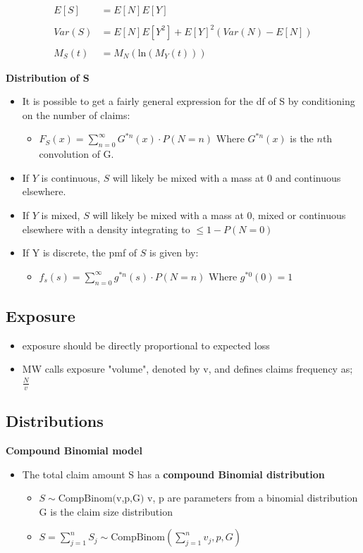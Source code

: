 \documentclass{article}
\begin{document}
\begin{align*}
    E[S] &= E[N]E[Y]\\
    \\
    Var(S) &= E[N]E[Y^2] + E[Y]^2(Var(N) - E[N])\\
    \\
    M_S(t) & = M_N(\text{ln}(M_Y(t)))
\end{align*}


\noindent\textbf{Distribution of S}
\begin{itemize}
    \item It is possible to get a fairly general expression for the df of S by conditioning on the number of claims:
    \begin{itemize}
        \item $F_S(x) = \sum_{n=0}^\infty G^{*n}(x) \cdot P(N=n)$ \hspace{2cm} Where $G^{*n}(x)$ is the $n$th convolution of G.
    \end{itemize}
    \item If $Y$ is continuous, $S$ will likely be mixed with a mass at 0 and continuous elsewhere.
    \item If $Y$ is mixed, $S$ will likely be mixed with a mass at 0, mixed or continuous elsewhere with a density integrating to $\leq 1 - P(N=0)$
    \item  If Y is discrete, the pmf of $S$ is given by:
    \begin{itemize}
        \item $f_s(s) = \sum_{n=0}^\infty g^{*n}(s)\cdot P(N=n)$ \hspace{2cm} Where $g^{*0}(0) = 1$
    \end{itemize}
\end{itemize}


\subsection{Exposure}
\begin{itemize}
    \item exposure should be directly proportional to expected loss
    \item MW calls exposure "volume", denoted by v, and defines claims frequency as;
    \subitem $\frac{N}{v}$
\end{itemize}

\subsection{Distributions}
\textbf{Compound Binomial model}
\begin{itemize}
    \item The total claim amount S has a \textbf{compound Binomial distribution}
    \begin{itemize}
        \item $S \sim \text{CompBinom(v,p,G)}$
        \subitem v, p are parameters from a binomial distribution
        \subitem G is the claim size distribution
        \item $S = \sum_{j=1}^n S_j \sim \text{CompBinom}(\sum_{j=1}^nv_j,p,G)$
    \end{itemize}
\end{itemize}
\end{document}
